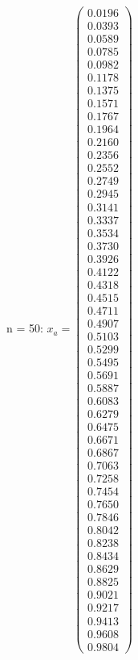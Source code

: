 \documentclass{udpreport}
\begin{document}
\begin{enumerate}
\begin{enumerate}
{{{{\begin{itemize}
\begin{itemize}
				n = 50: $x_{a} = \left(\begin{array}{c} 0.0196\\ 0.0393\\ 0.0589\\ 0.0785\\ 0.0982\\ 0.1178\\ 0.1375\\ 0.1571\\ 0.1767\\ 0.1964\\ 0.2160\\ 0.2356\\ 0.2552\\ 0.2749\\ 0.2945\\ 0.3141\\ 0.3337\\ 0.3534\\ 0.3730\\ 0.3926\\ 0.4122\\ 0.4318\\ 0.4515\\ 0.4711\\ 0.4907\\ 0.5103\\ 0.5299\\ 0.5495\\ 0.5691\\ 0.5887\\ 0.6083\\ 0.6279\\ 0.6475\\ 0.6671\\ 0.6867\\ 0.7063\\ 0.7258\\ 0.7454\\ 0.7650\\ 0.7846\\ 0.8042\\ 0.8238\\ 0.8434\\ 0.8629\\ 0.8825\\ 0.9021\\ 0.9217\\ 0.9413\\ 0.9608\\ 0.9804 \end{array}\right)$
				

\end{itemize}
\end{itemize}}}}}
\end{enumerate}
\end{enumerate}
\end{document}

